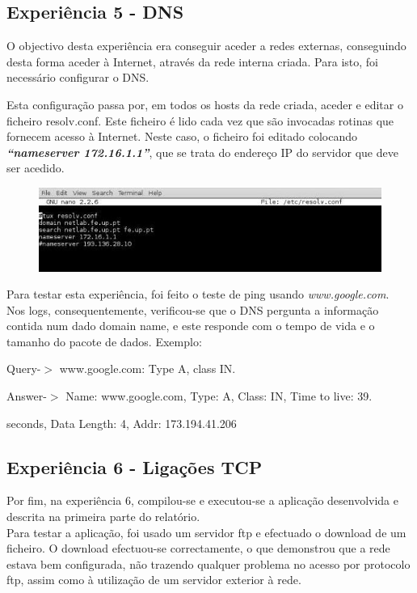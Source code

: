 \documentclass[a4paper]{article}
\begin{document}
\subsection{Experiência 5 - DNS}
O objectivo desta experiência era conseguir aceder a redes externas, conseguindo desta forma aceder à Internet, através da rede interna criada. Para isto, foi necessário configurar o DNS. 

Esta configuração passa por, em todos os hosts da rede criada, aceder e editar o ficheiro resolv.conf. Este ficheiro é lido cada vez que são invocadas rotinas que fornecem acesso à Internet. Neste caso, o ficheiro foi editado colocando \textbf{\textit{“nameserver 172.16.1.1”}}, que se trata do endereço IP do servidor que deve ser acedido.	

\begin{figure}[h!]
\centering
\includegraphics[scale=0.5]{res/image4.jpg}
\end{figure}

Para testar esta experiência, foi feito o teste de ping usando \emph{www.google.com}.\\
Nos logs, consequentemente, verificou-se que o DNS pergunta a informação contida num dado domain name, e este responde com o tempo de vida e o tamanho do pacote de dados.\linebreak
Exemplo:

Query-$>$ www.google.com: Type A, class IN.

Answer-$>$ Name: www.google.com, Type: A, Class: IN, Time to live: 39.

seconds, Data Length: 4, Addr: 173.194.41.206

\subsection{Experiência 6 - Ligações TCP}
Por fim, na experiência 6, compilou-se e executou-se a aplicação desenvolvida e descrita na primeira parte do relatório.\\
Para testar a aplicação, foi usado um servidor ftp e efectuado o download de um ficheiro. O download efectuou-se correctamente, o que demonstrou que a rede estava bem configurada, não trazendo qualquer problema no acesso por protocolo ftp, assim como à utilização de um servidor exterior à rede.
\end{document}
